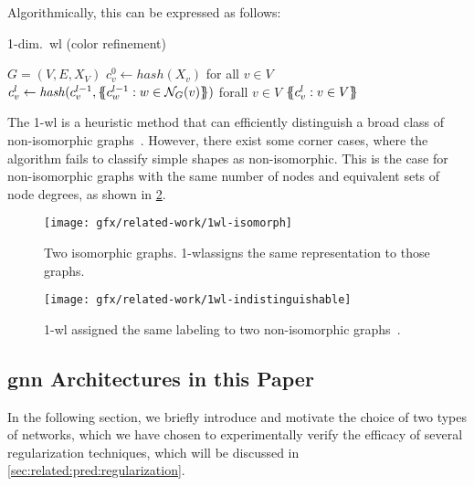 Algorithmically, this can be expressed as follows:
\begin{algorithm}[H]
    \caption{1-dim.\ \ac{wl} (color refinement)}
    \begin{algorithmic}[1]
        \Require $G = (V,E,X_{V})$
        \State $c_{v}^{0} \gets \mathit{hash}(X_{v})$ for all $v \in V$
        \Repeat
        \State $c_{v}^{l} \gets \mathit{hash}(c_{v}^{l-1}, \ldblbrace c_{w}^{l-1}: w \in \mathcal N_{G}(v)\rdblbrace)$ forall $v \in V$
        \State \Return $\ldblbrace c_{v}^l : v \in V \rdblbrace$
    \end{algorithmic}
\end{algorithm}

The 1-\acs{wl} is a heuristic method that can efficiently distinguish a broad class of non-isomorphic
graphs~\cite{Babai1979}.
However, there exist some corner cases, where the algorithm fails to classify
simple shapes as non-isomorphic. This is the case for non-isomorphic graphs with the same number of nodes and equivalent sets of node degrees, as shown in \cref*{fig:related:1-wl-indistinguishable}.

\begin{figure}[H]
    \centering
    \texttt{[image: gfx/related-work/1wl-isomorph]}
    \caption{Two isomorphic graphs. 1-\ac{wl}assigns the same representation to those graphs.}\label{fig:related:1-wl-indistinguishable}
\end{figure}

\begin{figure}[H]
    \centering
    \texttt{[image: gfx/related-work/1wl-indistinguishable]}
    \caption{1-\ac{wl} assigned the same labeling to two non-isomorphic graphs~\cite{Liu2022}.}\label{fig:related:1-wl-indistinguishable}
\end{figure}


\subsection{\acs*{gnn} Architectures in this Paper}
\label{sec:related:architectures}


In the following section, we briefly introduce and motivate the choice of two types of networks, which we have chosen to experimentally verify the efficacy of several regularization techniques, which will be discussed in \cref{sec:related:pred:regularization}.

